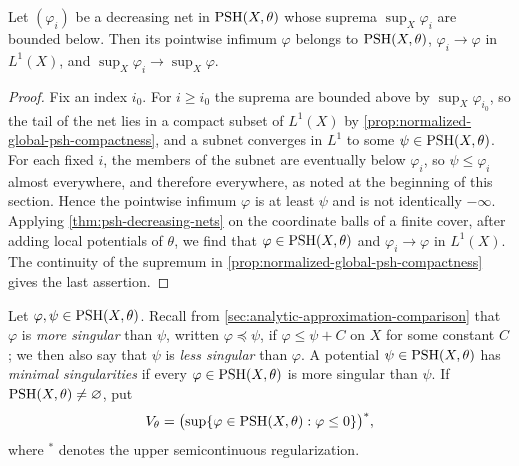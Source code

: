 \begin{corollary}\label{cor:global-decreasing-nets}
Let $(\varphi_i)$ be a decreasing net in $\mathrm{PSH}(X,\theta)$ whose suprema $\sup_X\varphi_i$ are bounded below. Then its pointwise infimum $\varphi$ belongs to $\mathrm{PSH}(X,\theta)$, $\varphi_i\to\varphi$ in $L^1(X)$, and $\sup_X\varphi_i\to\sup_X\varphi$.
\end{corollary}
\begin{proof}
Fix an index $i_0$. For $i\geq i_0$ the suprema are bounded above by $\sup_X\varphi_{i_0}$, so the tail of the net lies in a compact subset of $L^1(X)$ by \cref{prop:normalized-global-psh-compactness}, and a subnet converges in $L^1$ to some $\psi\in\mathrm{PSH}(X,\theta)$. For each fixed $i$, the members of the subnet are eventually below $\varphi_i$, so $\psi\leq\varphi_i$ almost everywhere, and therefore everywhere, as noted at the beginning of this section. Hence the pointwise infimum $\varphi$ is at least $\psi$ and is not identically $-\infty$. Applying \cref{thm:psh-decreasing-nets} on the coordinate balls of a finite cover, after adding local potentials of $\theta$, we find that $\varphi\in\mathrm{PSH}(X,\theta)$ and $\varphi_i\to\varphi$ in $L^1(X)$. The continuity of the supremum in \cref{prop:normalized-global-psh-compactness} gives the last assertion.
\end{proof}

\begin{definition}\label{def:global-minimal-potential}
Let $\varphi,\psi\in\mathrm{PSH}(X,\theta)$. Recall from \cref{sec:analytic-approximation-comparison} that $\varphi$ is \emph{more singular} than $\psi$, written $\varphi\preceq\psi$, if $\varphi\leq\psi+C$ on $X$ for some constant $C$; we then also say that $\psi$ is \emph{less singular} than $\varphi$. A potential $\psi\in\mathrm{PSH}(X,\theta)$ has \emph{minimal singularities} if every $\varphi\in\mathrm{PSH}(X,\theta)$ is more singular than $\psi$. If $\mathrm{PSH}(X,\theta)\ne\varnothing$, put
\[
 V_\theta=\bigl(\sup\{\varphi\in\mathrm{PSH}(X,\theta):\varphi\leq0\}\bigr)^*,
\]
where ${}^*$ denotes the upper semicontinuous regularization.
\end{definition}

